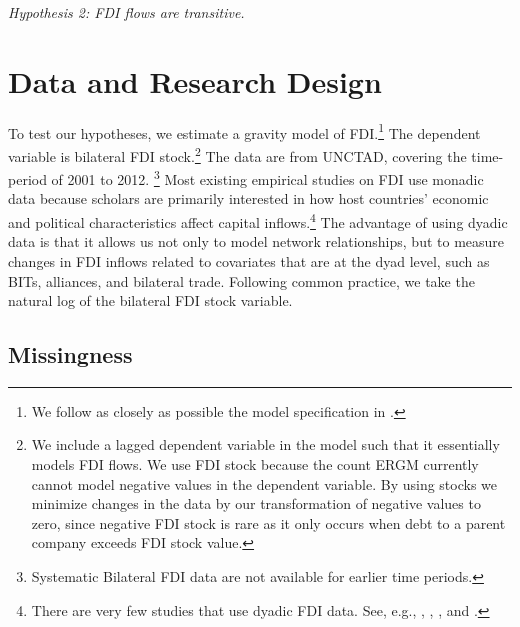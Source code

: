 \documentclass[reqno,onecolumn,letterpaper,12pt]{article}
\begin{document}
\begin{center}
\textit{Hypothesis 2: FDI flows are transitive.}
\end{center}




\section{Data and Research Design}


To test our hypotheses, we estimate a gravity model of FDI.\footnote{We follow as closely as possible the model specification in \citet{Li_Vashchilko:2010}.} The dependent variable is bilateral FDI stock.\footnote{We include a lagged dependent variable in the model such that it essentially models FDI flows. We use FDI stock because the count ERGM currently cannot model negative values in the dependent variable. By using stocks we minimize changes in the data by our transformation of negative values to zero, since negative FDI stock is rare as it only occurs when debt to a parent company exceeds FDI stock value.} The data are from UNCTAD, covering the time-period of 2001 to 2012.%
\footnote{Systematic Bilateral FDI data are not available for earlier time periods.} Most existing empirical studies on FDI use monadic data because scholars are primarily interested in how host countries' economic and political characteristics affect capital inflows.\footnote{There are very few studies that use dyadic FDI data. See, e.g., \citet{Frenkel_et_al:2004}, \citet{Leblang:2010}, \citet{Li_Vashchilko:2010}, and \citet{Razin_et_al:2005}. } The advantage of using dyadic data is that it allows us not only to model network relationships, but to measure changes in FDI inflows related to covariates that are at the dyad level, such as BITs, alliances, and bilateral trade. Following common practice, we take the natural log of the bilateral FDI stock variable.

\subsection{Missingness}\label{missingness}
\end{document}
